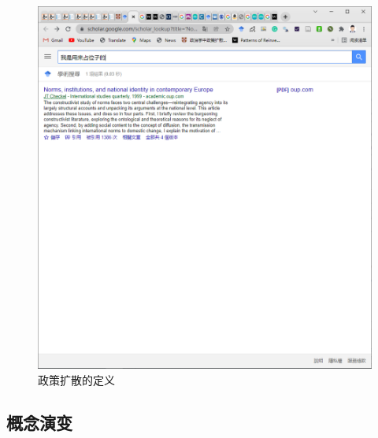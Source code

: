 \documentclass[
  12pt,
]{ctexart}
\begin{document}
\begin{figure}
\includegraphics[width=1\linewidth]{../figures/ngram} \caption{政策扩散的定义}\label{fig:unnamed-chunk-2}
\end{figure}

\hypertarget{ux6982ux5ff5ux6f14ux53d8}{%
\subsection{概念演变}\label{ux6982ux5ff5ux6f14ux53d8}}
\end{document}
